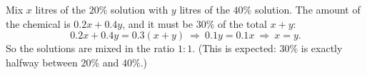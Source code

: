 Mix $x$ litres of the $20\%$ solution with $y$ litres of the $40\%$ solution. The amount of the chemical is $0.2x+0.4y$, and it must be $30\%$ of the total $x+y$:
\[
0.2x+0.4y=0.3(x+y)\ \Longrightarrow\ 0.1y=0.1x\ \Longrightarrow\ x=y .
\]
So the solutions are mixed in the ratio $\boxed{1:1}$. (This is expected: $30\%$ is exactly halfway between $20\%$ and $40\%$.)
